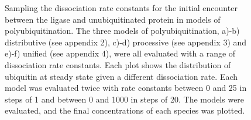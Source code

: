 \documentclass[11pt]{article}
\begin{document}
{\begin{figure}[H]
	\hfill

	\caption{Sampling the dissociation rate constants for the initial encounter between the ligase and unubiquitinated protein in models of polyubiquitination. The three models of polyubiquitination, a)-b) distributive (see appendix 2), c)-d) processive (see appendix 3) and e)-f) unified (see appendix 4), were all evaluated with a range of dissociation rate constants. Each plot shows the distribution of ubiquitin at steady state given a different dissociation rate. Each model was evaluated twice with rate constants between 0 and 25 in steps of 1 and between 0 and 1000 in steps of 20. The models were evaluated, and the final concentrations of each species was plotted.}
	\label{fig:Sampling}
\end{figure}
}
\end{document}
